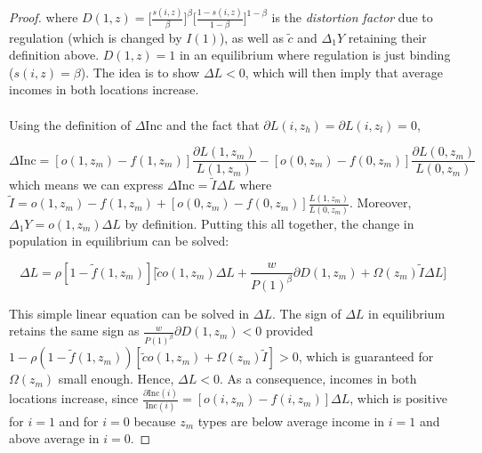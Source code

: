 \documentclass[12pt]{article}
\begin{document}
\begin{enumerate}
\begin{proof}
			where $D(1, z) = \bigg[\frac{s(i, z)}{\beta}\bigg]^{\beta}\bigg[\frac{1 - s(i, z)}{1 - \beta}\bigg]^{1 - \beta} $ is the \textit{distortion factor} due to regulation (which is changed by $I(1)$), as well as $\tilde{c}$ and $\Delta_{1}Y$ retaining their definition above. $D(1, z) = 1$ in an equilibrium where regulation is just binding ($s(i, z) = \beta$). The idea is to show $\Delta L < 0$, which will then imply that average incomes in both locations increase.
			
			\paragraph*{}
			 Using the definition of $\Delta \text{Inc}$ and the fact that $\partial L(i, z_{h}) = \partial L(i, z_{l}) = 0$,
			 
			 \begin{equation*}
			 	\Delta \text{Inc} = [o(1, z_{m}) - f(1, z_{m})]\frac{\partial L(1, z_{m})}{L(1, z_{m})} - [o(0, z_{m}) - f(0, z_{m})]\frac{\partial L(0, z_{m})}{L(0, z_{m})}
			 \end{equation*} 
			which means we can express $\Delta \text{Inc} = \tilde{I}\Delta L$ where $\tilde{I} = o(1, z_{m}) - f(1, z_{m}) + [o(0, z_{m}) - f(0, z_{m})]\frac{L(1, z_{m})}{L(0, z_{m})}$. Moreover, $\Delta_{1}Y = o(1, z_{m})\Delta L$ by definition. Putting this all together, the change in population in equilibrium can be solved:
			
			\begin{equation}\label{AppendixEq:EquilibriumPopMTypes}
					\Delta L = \rho[1 - \tilde{f}(1, z_{m})]\big[ \tilde{c}o(1, z_{m})\Delta L + \frac{w}{P(1)^{\beta}}\partial D(1, z_{m})  + \Omega(z_{m})\tilde{I}\Delta L \big]
			\end{equation}
			
			This simple linear equation can be solved in $\Delta L$. The sign of $\Delta L$ in equilibrium retains the same sign as $\frac{w}{P(1)^{\beta}}\partial D(1, z_{m}) < 0$ provided $1 - \rho(1-\tilde{f}(1, z_{m}))[\tilde{c}o(1, z_{m}) + \Omega(z_{m})\tilde{I}] > 0$, which is guaranteed for $\Omega(z_{m})$ small enough. Hence, $\Delta L < 0$. As a consequence, incomes in both locations increase, since $\frac{\partial \text{Inc}(i)}{\text{Inc}(i)} = [o(i, z_{m}) - f(i, z_{m})]\Delta L$, which is positive for $i = 1$ and for $i = 0$ because $z_{m}$ types are below average income in $i = 1$ and above average in $i = 0$.  
			
			
		\end{proof}
		

\end{enumerate}
\end{document}
